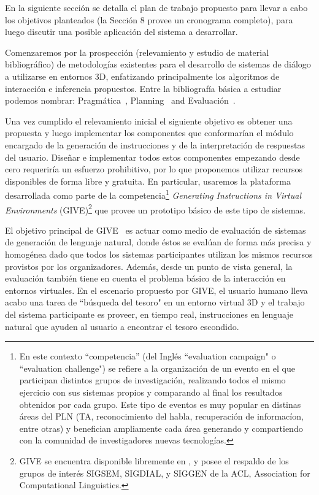 En la siguiente secci\'on se detalla el plan de trabajo propuesto para llevar a cabo los objetivos planteados (la Secci\'on 8
provee un cronograma completo), para luego discutir una posible aplicaci\'on del sistema a desarrollar.


Comenzaremos por la prospecci\'on (relevamiento y estudio de material bibliogr\'afico)
de metodolo\-g\'ias existentes para el desarrollo de sistemas de di\'alogo a
utilizarse en entornos 3D, enfatizando principalmente los algoritmos de
interacci\'on e inferencia propuestos. Entre la bibliograf\'ia b\'asica a
estudiar podemos nombrar:
Pragm\'atica~\citep{grice75,clark96,kehler04,devault08,ginzburg09},
Planning~\citep{kautz99,hoffmann01,nau04,petrick06} and Evaluaci\'on~\citep{}.

Una vez cumplido el relevamiento inicial el siguiente objetivo es
obtener una propuesta y luego implementar los componentes que
conformar\'ian el m\'odulo encargado de la generaci\'on de instrucciones
y de la interpretaci\'on de respuestas del usuario.
Dise\~nar e implementar todos estos componentes empezando desde cero requerir\'ia un esfuerzo prohibitivo, por lo que proponemos utilizar recursos disponibles de forma libre y gratuita. En particular, usaremos la plataforma desarrollada como parte de la competencia\footnote{En este contexto ``competencia'' (del Ingl\'es ``evaluation campaign" o ``evaluation challenge") se refiere a la organizaci\'on de un evento en el que participan distintos grupos de investigaci\'on, realizando todos el mismo ejercicio con sus sistemas propios y comparando al final los resultados obtenidos por cada grupo. Este tipo de eventos es muy popular en distinas \'areas del PLN (TA, reconocimiento del habla, recuperaci\'on de informac\'ion, entre otras) y benefician ampliamente cada \'area generando y compartiendo con la comunidad de investigadores nuevas tecnolog\'ias.} \textit{Generating Instructions in Virtual Environments} (GIVE)\footnote{GIVE se encuentra disponible libremente en  , y posee el respaldo de los grupos de inter\'es SIGSEM, SIGDIAL, y SIGGEN de la ACL, Association for Computational Linguistics.} que
provee un prototipo b\'asico de este tipo de sistemas.

El objetivo principal de GIVE~\citep{byron09} es actuar como medio de
evaluaci\'on de sistemas de generaci\'on
de lenguaje natural, donde \'estos se eval\'uan de forma m\'as precisa y homog\'enea dado que todos los sistemas participantes utilizan los mismos recursos provistos por los organizadores. Adem\'as, desde un punto de vista general, la evaluaci\'on
tambi\'en tiene en cuenta el problema b\'asico de la interacci\'on en
entornos virtuales.  En el escenario propuesto por GIVE, el usuario
humano lleva acabo una tarea de ``b\'usqueda del tesoro" en un entorno
virtual 3D y el trabajo del sistema participante es proveer, en tiempo
real, instrucciones en lenguaje natural que ayuden al usuario
a encontrar el tesoro escondido.

